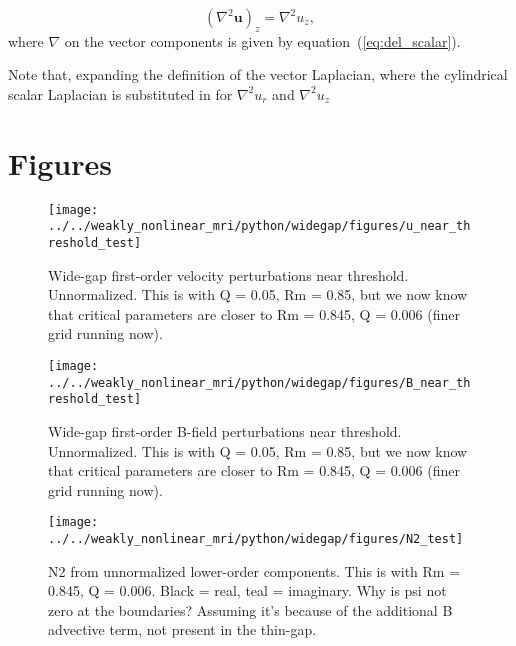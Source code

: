 \documentclass{paper}
\begin{document}
\begin{equation}
  \label{eq:vec_lap_z}
  (\nabla^2 \mathbf{u})_z = \nabla^2 u_z,
\end{equation}
where $\nabla$ on the vector components is given by equation~(\ref{eq:del_scalar}).

Note that, expanding the definition of the vector Laplacian, where the cylindrical scalar Laplacian is substituted in for $\nabla^2 u_r$ and $\nabla^2 u_z$  


\section{Figures}

\begin{figure}[h!]
\centering
\texttt{[image: ../../weakly\_nonlinear\_mri/python/widegap/figures/u\_near\_threshold\_test]}
\caption{Wide-gap first-order velocity perturbations near threshold. Unnormalized. This is with Q = 0.05, Rm = 0.85, but we now know that critical parameters are closer to Rm = 0.845, Q = 0.006 (finer grid running now).
\label{fig:firstorder_u}}
\end{figure}

\begin{figure}[h!]
\centering
\texttt{[image: ../../weakly\_nonlinear\_mri/python/widegap/figures/B\_near\_threshold\_test]}
\caption{Wide-gap first-order B-field perturbations near threshold. Unnormalized. This is with Q = 0.05, Rm = 0.85, but we now know that critical parameters are closer to Rm = 0.845, Q = 0.006 (finer grid running now).
\label{fig:firstorder_B}}
\end{figure}

\begin{figure}[h!]
\centering
\texttt{[image: ../../weakly\_nonlinear\_mri/python/widegap/figures/N2\_test]}
\caption{N2 from unnormalized lower-order components. This is with Rm = 0.845, Q = 0.006. Black = real, teal = imaginary. Why is psi not zero at the boundaries? Assuming it's because of the additional B advective term, not present in the thin-gap.
\label{fig:firstorder_B}}
\end{figure}
\end{document}
